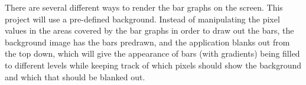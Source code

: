 There are several different ways to render the bar graphs on the screen. This project will use a pre-defined background. Instead of manipulating the pixel values in the areas covered by the bar graphs in order to draw out the bars, the background image has the bars predrawn, and the application blanks out from the top down, which will give the appearance of bars (with gradients) being filled to different levels while keeping track of which pixels should
show the background and which that should be blanked out.
